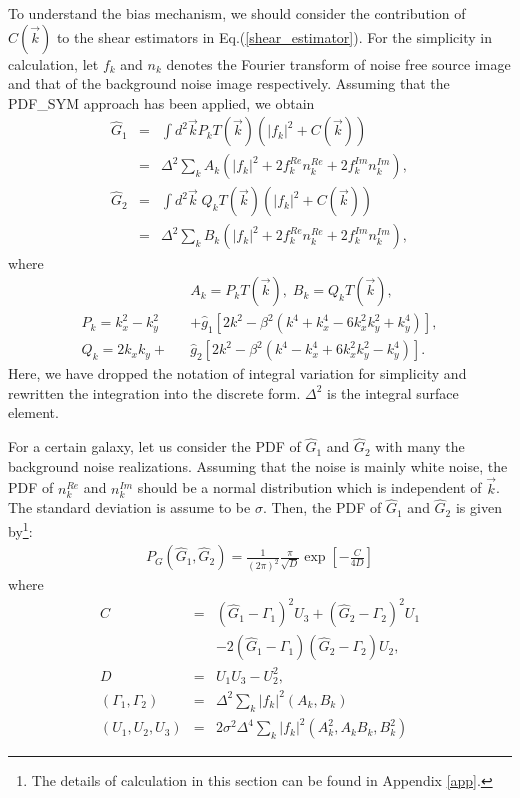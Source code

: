 \documentclass[twocolumn]{aastex62}
\begin{document}
To understand the bias mechanism, we should consider the contribution of $C(\vec{k})$ to the shear estimators in Eq.(\ref{shear_estimator}). For the simplicity in calculation, let $f_k$ and $n_k$ denotes the Fourier transform of noise free source image and that of the background noise image respectively. Assuming that the PDF\_SYM approach has been applied, we obtain
\begin{eqnarray}
\label{Eq:gg}
\hat{G}_1&=&\int{d}^2\vec{k} P_k T(\vec{k})\left(\vert f_k\vert^2 + C(\vec{k})\right) \\ \nonumber
&=&\Delta^2\sum_k A_k \left(\vert f_k\vert^2+2f_k^{Re}n_k^{Re}+2f_k^{Im}n_k^{Im}\right), \\ \nonumber
\hat{G}_2&=&\int{d}^2\vec{k} \; Q_k T(\vec{k})\left(\vert f_k\vert^2 + C(\vec{k})\right)\\ \nonumber
&=&\Delta^2\sum_kB_k\left(\vert f_k\vert^2+2f_k^{Re}n_k^{Re}+2f_k^{Im}n_k^{Im}\right),
\end{eqnarray}
where
\begin{eqnarray}
&&A_k = P_k T(\vec{k}),\; B_k = Q_k T(\vec{k}) ,\\ \nonumber
P_k = k_x^2-k_y^2&& + \hat{g}_1\left[2k^2-\beta^2\left(k^4+k_x^4-6k_x^2k_y^2+k_y^4\right)\right],\\ \nonumber
Q_k = 2k_xk_y+&&\hat{g}_2\left[2k^2-\beta^2\left(k^4-k_x^4+6k_x^2k_y^2-k_y^4\right)\right].
\end{eqnarray}
Here, we have dropped the notation of integral variation for simplicity and rewritten the integration into the discrete form. $\Delta^2$ is the integral surface element.

For a certain galaxy, let us consider the PDF of $\hat{G}_1$ and $\hat{G}_2$ with many the background noise realizations. Assuming that the noise is mainly white noise, the PDF of $n_k^{Re}$ and $n_k^{Im}$ should be a normal distribution which is independent of $\vec{k}$. The standard deviation is assume to be $\sigma$. Then, the PDF of $\hat{G}_1$ and $\hat{G}_2$ is given by\footnote{The details of calculation in this section can be found in Appendix \ref{app}.}:
\begin{eqnarray}
\label{Eq:Pgg_1}
P_G\left(\hat{G}_1,\hat{G}_2\right)=\frac{1}{(2\pi)^2}\frac{\pi}{\sqrt{D}}\exp\left[-\frac{C}{4D}\right]
\end{eqnarray}
where
\begin{eqnarray}
\label{Eq:Pgg_2}
C &=& \left(\hat{G}_1-\Gamma_1\right)^2U_3+\left(\hat{G}_2-\Gamma_2\right)^2U_1 \\ \nonumber
&&-2\left(\hat{G}_1-\Gamma_1\right)\left(\hat{G}_2-\Gamma_2\right)U_2,\\ \nonumber
D&=& U_1U_3-U_2^2,\\ \nonumber
\left(\Gamma_1,\Gamma_2\right)&=&\Delta^2\sum_k\vert f_k\vert^2\left(A_k,B_k\right)\\ \nonumber
\left(U_1,U_2,U_3\right)&=&2\sigma^2\Delta^4\sum_k\vert f_k\vert^2\left(A_k^2,A_kB_k,B_k^2\right)
\end{eqnarray}
\end{document}
